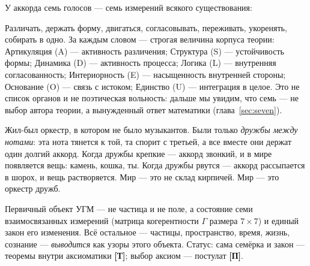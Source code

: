 \documentclass[11pt,letterpaper]{article}
\newcommand{\Gam}{\Gamma}
\newcommand{\stT}{\textbf{[Т]}\xspace}
\newcommand{\stP}{\textbf{[П]}\xspace}
\begin{document}
У аккорда семь голосов --- семь измерений всякого существования:

\begin{center}
\end{center}

Различать, держать форму, двигаться, согласовывать, переживать,
укоренять, собирать в одно. За каждым словом --- строгая величина
корпуса теории: Артикуляция (A) --- активность различения; Структура
(S) --- устойчивость формы; Динамика (D) --- активность процесса;
Логика (L) --- внутренняя согласованность; Интериорность (E) ---
насыщенность внутренней стороны; Основание (O) --- связь с истоком;
Единство (U) --- интеграция в целое. Это не список органов и не
поэтическая вольность:
дальше мы увидим, что семь --- не выбор автора теории, а вынужденный
ответ математики (глава~\ref{sec:seven}).

\begin{skazbox}
Жил-был оркестр, в котором не было музыкантов. Были только
\emph{дружбы между нотами}: эта нота тянется к той, та спорит с
третьей, а все вместе они держат один долгий аккорд. Когда дружбы
крепкие --- аккорд звонкий, и в мире появляется вещь: камень, кошка,
ты. Когда дружбы рвутся --- аккорд рассыпается в шорох, и вещь
растворяется. Мир --- это не склад кирпичей. Мир --- это оркестр
дружб.
\end{skazbox}

\begin{factbox}
Первичный объект УГМ --- не частица и не поле, а состояние
семи взаимосвязанных измерений (матрица когерентности $\Gam$ размера
$7{\times}7$) и единый закон его изменения. Всё остальное ---
частицы, пространство, время, жизнь, сознание --- \emph{выводится}
как узоры этого объекта. Статус: сама семёрка и закон --- теоремы
внутри аксиоматики \stT; выбор аксиом --- постулат \stP.
\end{factbox}
\end{document}
